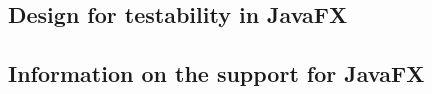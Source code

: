 


%

\subsection{Design for testability in JavaFX}


\subsection{Information on the support for JavaFX \gdauts{}}

